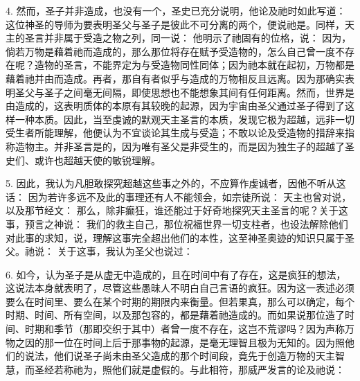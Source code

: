 4. 然而，圣子并非造成，也没有一个，圣史已充分说明，他论及祂时如此写道： 这位神圣的导师为要表明圣父与圣子是彼此不可分离的两个，便说祂是。同样，天主的圣言并非属于受造之物之列，同一说： 他明示了祂固有的位格，说： 因为，倘若万物是藉着祂而造成的，那么那位将存在赋予受造物的，怎么自己曾一度不存在呢？造物的圣言，不能界定为与受造物同性同体；因为祂本就在起初，万物都是藉着祂并由而造成。再者，那自有者似乎与造成的万物相反且远离。因为那确实表明圣父与圣子之间毫无间隔，即使思想也不能想象其间有任何距离。然而，世界是由造成的，这表明质体的本原有其较晚的起源，因为宇宙由圣父通过圣子得到了这样一种本质。因此，当至虔诚的默观天主圣言的本质，发现它极为超越，远非一切受生者所能理解，他便认为不宜谈论其生成与受造；不敢以论及受造物的措辞来指称造物主。并非圣言是的，因为唯有圣父是非受生的，而是因为独生子的超越了圣史们、或许也超越天使的敏锐理解。\par

5. 因此，我认为凡胆敢探究超越这些事之外的，不应算作虔诚者，因他不听从这话： 因为若许多远不及此的事理还有人不能领会，如宗徒所说： 天主也曾对说， 以及那节经文： 那么，除非癫狂，谁还能过于好奇地探究天主圣言的呢？关于这事，预言之神说： 我们的救主自己，那位祝福世界一切支柱者，也设法解除他们对此事的求知，说，理解这事完全超出他们的本性，这至神圣奥迹的知识只属于圣父。祂说： 关于这事，我认为圣父也说过：\par

6. 如今，认为圣子是从虚无中造成的，且在时间中有了存在，这是疯狂的想法，这说法本身就表明了，尽管这些愚昧人不明白自己言语的疯狂。因为这一表述必须要么在时间里、要么在某个时期的期限内来衡量。但若果真，那么可以确定，每个时期、时间、所有空间，以及那包容的，都是藉着祂造成的。而如果说那位造了时间、时期和季节（那即交织于其中）者曾一度不存在，这岂不荒谬吗？因为声称万物之因的那一位在时间上后于那事物的起源，是毫无理智且极为无知的。因为照他们的说法，他们说圣子尚未由圣父造成的那个时间段，竟先于创造万物的天主智慧，而圣经若称祂为，照他们就是虚假的。与此相符，那威严发言的论及祂说：\par

